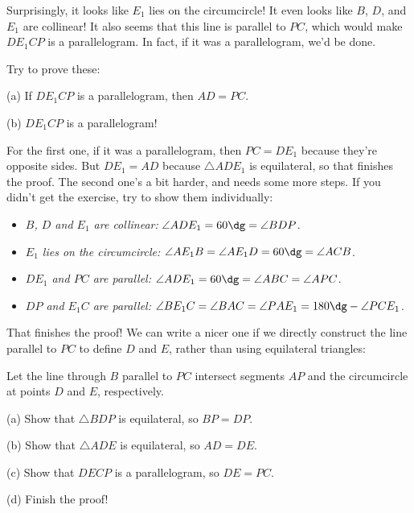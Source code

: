 \documentclass[11pt,paper=letter]{scrartcl}
\begin{document}
Surprisingly, it looks like $E_1$ lies on the circumcircle! It even looks like $B$, $D$, and $E_1$ are collinear! It also seems that this line is parallel to $PC$, which would make $DE_1CP$ is a parallelogram. In fact, if it was a parallelogram, we'd be done. 

\begin{exboxed} Try to prove these:
  \begin{enumthin}
    \item[(a)] If $DE_1CP$ is a parallelogram, then $AD = PC$.
    \item[(b)] $DE_1CP$ is a parallelogram! \hints{\ref{h:vs02} \ref{h:vs03}}
  \end{enumthin}
\end{exboxed}

For the first one, if it was a parallelogram, then $PC = DE_1$ because they're opposite sides. But $DE_1 = AD$ because $\triangle ADE_1$ is equilateral, so that finishes the proof. The second one's a bit harder, and needs some more steps. If you didn't get the exercise, try to show them individually:
\begin{itemize}[itemsep=-0.7ex]
  \item \emph{$B$, $D$ and $E_1$ are collinear:} $\angle ADE_1 = 60\dg = \angle BDP$.
  \item \emph{$E_1$ lies on the circumcircle:} $\angle AE_1B = \angle AE_1D = 60\dg = \angle ACB$.
  \item \emph{$DE_1$ and $PC$ are parallel:} $\angle ADE_1 = 60\dg = \angle ABC = \angle APC$.
  \item \emph{$DP$ and $E_1C$ are parallel:} $\angle BE_1C = \angle BAC = \angle PAE_1 = 180\dg - \angle PCE_1$.
\end{itemize}

That finishes the proof! We can write a nicer one if we directly construct the line parallel to $PC$ to define $D$ and $E$, rather than using equilateral triangles:

\begin{probboxed}
  Let the line through $B$ parallel to $PC$ intersect segments $AP$ and the circumcircle at points $D$ and $E$, respectively.
  \begin{enumthin}
    \item[(a)] Show that $\triangle BDP$ is equilateral, so $BP = DP$. \hint{\ref{h:vs04}}
    \item[(b)] Show that $\triangle ADE$ is equilateral, so $AD = DE$.
    \item[(c)] Show that $DECP$ is a parallelogram, so $DE = PC$. \hint{\ref{h:vs02}}
    \item[(d)] Finish the proof!
  \end{enumthin}
\end{probboxed}
\end{document}
